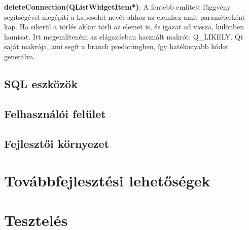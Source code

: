 \textbf{deleteConnection(QListWidgetItem*)}: A fentebb említett függvény segítségével megépíti a kapcsolat nevét
ahhoz az elemhez amit paraméterként kap. Ha sikerül a törlés akkor törli az elemet is, és igazat ad vissza, különben hamisat.
Itt megemlíteném az elágazásban használt makrót: Q\_LIKELY. Qt saját makrója, ami segít a branch predictingben, így
hatékonyabb kódot generálva.

\subsection{SQL eszközök}


\subsection{Felhasználói felület}
\subsection{Fejlesztői környezet}

\section{Továbbfejlesztési lehetőségek}

\section{Tesztelés}